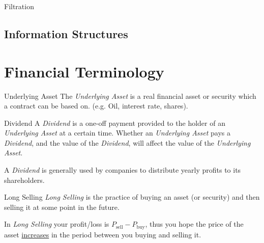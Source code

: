 \documentclass[11pt,a4paper]{article}
\begin{document}
  \begin{definition}{Filtration}

  \end{definition}

\subsection{Information Structures}


\section{Financial Terminology}\label{sec_financial_terminology}

  \begin{definition}{Underlying Asset}
    The \textit{Underlying Asset} is a real financial asset or security which a contract can be based on. (e.g. Oil, interest rate, shares).
  \end{definition}

  \begin{definition}{Dividend}
    A \textit{Dividend} is a one-off payment provided to the holder of an \textit{Underlying Asset} at a certain time. Whether an \textit{Underlying Asset} pays a \textit{Dividend}, and the value of the \textit{Dividend}, will affect the value of the \textit{Underlying Asset}.
    \par A \textit{Dividend} is generally used by companies to distribute yearly profits to its shareholders.
  \end{definition}

  \begin{definition}{Long Selling}
    \textit{Long Selling} is the practice of buying an asset (or security) and then selling it at some point in the future.
    \par In \textit{Long Selling} your profit/loss is $P_{\text{sell}}-P_{\text{buy}}$, thus you hope the price of the asset \underline{increases} in the period between you buying and selling it.
  \end{definition}
\end{document}
